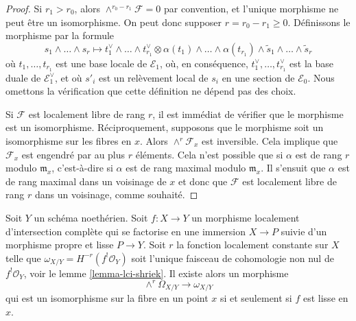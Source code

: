 \begin{proof}
Si $r_1 > r_0$, alors $\wedge^{r_0 - r_1}\mathcal{F} = 0$ par convention, et l'unique morphisme ne peut être un isomorphisme. On peut donc supposer $r = r_0 - r_1 \geq 0$. Définissons le morphisme par la formule
$$
s_1 \wedge \ldots \wedge s_r \mapsto
t_1^\vee \wedge \ldots \wedge t_{r_1}^\vee \otimes
\alpha(t_1) \wedge \ldots \wedge \alpha(t_{r_1}) \wedge
\tilde s_1 \wedge \ldots \wedge \tilde s_r
$$
où $t_1, \ldots, t_{r_1}$ est une base locale de $\mathcal{E}_1$, où, en conséquence, $t_1^\vee, \ldots, t_{r_1}^\vee$ est la base duale de $\mathcal{E}_1^\vee$, et où $s'_i$ est un relèvement local de $s_i$ en une section de $\mathcal{E}_0$. Nous omettons la vérification que cette définition ne dépend pas des choix.

\medskip\noindent
Si $\mathcal{F}$ est localement libre de rang $r$, il est immédiat de vérifier que le morphisme est un isomorphisme. Réciproquement, supposons que le morphisme soit un isomorphisme sur les fibres en $x$. Alors $\wedge^r\mathcal{F}_x$ est inversible. Cela implique que $\mathcal{F}_x$ est engendré par au plus $r$ éléments. Cela n'est possible que si $\alpha$ est de rang $r$ modulo $\mathfrak m_x$, c'est-à-dire si $\alpha$ est de rang maximal modulo $\mathfrak m_x$. Il s'ensuit que $\alpha$ est de rang maximal dans un voisinage de $x$ et donc que $\mathcal{F}$ est localement libre de rang $r$ dans un voisinage, comme souhaité.
\end{proof}

\begin{lemma}
\label{lemma-fundamental-class-lci}
Soit $Y$ un schéma noethérien. Soit $f : X \to Y$ un morphisme localement d'intersection complète qui se factorise en une immersion $X \to P$ suivie d'un morphisme propre et lisse $P \to Y$. Soit $r$ la fonction localement constante sur $X$ telle que $\omega_{X/Y} = H^{-r}(f^!\mathcal{O}_Y)$ soit l'unique faisceau de cohomologie non nul de $f^!\mathcal{O}_Y$, voir le lemme \ref{lemma-lci-shriek}. Il existe alors un morphisme
$$
\wedge^r\Omega_{X/Y} \longrightarrow \omega_{X/Y}
$$
qui est un isomorphisme sur la fibre en un point $x$ si et seulement si $f$ est lisse en $x$.
\end{lemma}

